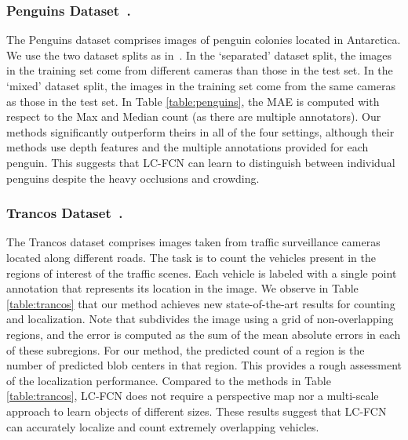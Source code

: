 \documentclass[runningheads]{llncs}
\begin{document}
\subsubsection{Penguins Dataset~\cite{arteta2016counting}.}
The Penguins dataset comprises images of penguin colonies located in Antarctica. We use the two dataset splits as in~\cite{arteta2016counting}. In the `separated' dataset split, the images in the training set come from different cameras than those in the test set. In the `mixed' dataset split, the images in the training set come from the same cameras as those in the test set. In Table \ref{table:penguins}, the MAE is computed with respect to the Max and Median count (as there are multiple annotators). Our methods significantly outperform theirs in all of the four settings, although their methods use depth features and the multiple annotations provided for each penguin. This suggests that LC-FCN can learn to distinguish between individual penguins despite the heavy occlusions and crowding.


\subsubsection{Trancos Dataset~\cite{onoro2016towards}.}\label{sec:trancos}
The Trancos dataset comprises images taken from traffic surveillance cameras located along different roads. The task is to count the vehicles present in the regions of interest of the traffic scenes. Each vehicle is labeled with a single point annotation that represents its location in the image.
We observe in Table \ref{table:trancos} that our method achieves new state-of-the-art results for counting and localization. Note that  subdivides the image using a grid of  non-overlapping regions, and the error is computed as the sum of the mean absolute errors in each of these subregions. For our method, the predicted count of a region is the number of predicted blob centers in that region. This provides a rough assessment of the localization performance. Compared to the methods in Table \ref{table:trancos}, LC-FCN does not require a perspective map nor a multi-scale approach to learn objects of different sizes. These results suggest that LC-FCN can accurately localize and count extremely overlapping vehicles.
\end{document}
